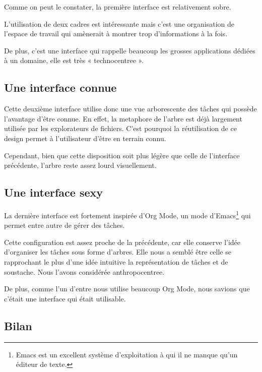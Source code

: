 \documentclass[11pt]{article}
\begin{document}

Comme on peut le constater, la première interface est relativement sobre.

L'utilisation de deux cadres est intéressante mais c'est une
organisation de l'espace de travail qui amènerait à montrer trop
d'informations à la fois.

De plus, c'est une interface qui rappelle beaucoup les grosses
applications dédiées à un domaine, elle est très « \gls{technocentre}e ».


\subsection{Une interface connue}


Cette deuxième interface utilise donc une vue arborescente des tâches
qui possède l'avantage d'être connue. En effet, la \gls{metaphore} de
l'arbre est déjà largement utilisée par les explorateurs de fichiers.
C'est pourquoi la réutilisation de ce design permet à l'utilisateur
d'être en terrain connu.

Cependant, bien que cette disposition soit plus légère que celle de
l'interface précédente, l'arbre reste assez lourd visuellement.


\subsection{Une interface sexy}


La dernière interface est fortement inspirée d'Org Mode, un mode
d'Emacs\footnote{Emacs est un excellent système d'exploitation à qui
  il ne manque qu'un éditeur de texte.} qui permet entre autre de
gérer des tâches.

Cette configuration est assez proche de la précédente, car elle
conserve l'idée d'organiser les tâches sous forme d'arbres. Elle nous a
semblé être celle se rapprochant le plus d'une idée intuitive la
représentation de tâches et de \gls{soustache}. Nous l'avons considérée \gls{anthropocentre}e.

De plus, comme l'un d'entre nous utilise beaucoup Org Mode, nous
savions que c'était une interface qui était utilisable.


\subsection{Bilan}
\end{document}
